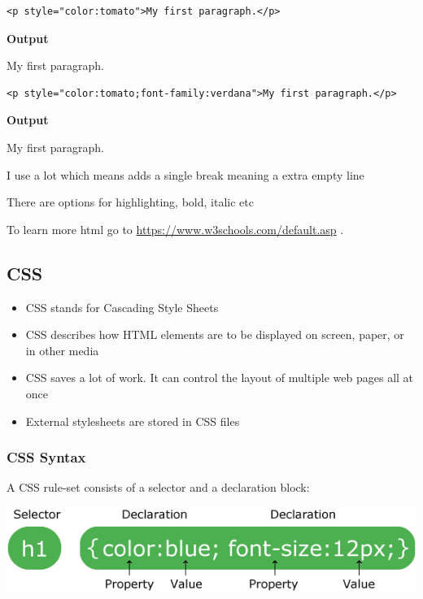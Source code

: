 \documentclass[
]{book}
\providecommand{\tightlist}{%
  \setlength{\itemsep}{0pt}\setlength{\parskip}{0pt}}
\begin{document}
\begin{verbatim}
<p style="color:tomato">My first paragraph.</p>
\end{verbatim}

\textbf{Output}

My first paragraph.

\begin{verbatim}
<p style="color:tomato;font-family:verdana">My first paragraph.</p>
\end{verbatim}

\textbf{Output}

My first paragraph.

I use a lot which means adds a single break meaning a extra empty line

There are options for highlighting, bold, italic etc

To learn more html go to \url{https://www.w3schools.com/default.asp} .

\hypertarget{css}{%
\subsection{CSS}\label{css}}

\begin{itemize}
\tightlist
\item
  CSS stands for Cascading Style Sheets
\item
  CSS describes how HTML elements are to be displayed on screen, paper, or in other media
\item
  CSS saves a lot of work. It can control the layout of multiple web pages all at once
\item
  External stylesheets are stored in CSS files
\end{itemize}

\hypertarget{css-syntax}{%
\subsubsection{CSS Syntax}\label{css-syntax}}

A CSS rule-set consists of a selector and a declaration block:

\includegraphics{img/css_selector.gif}
\end{document}
